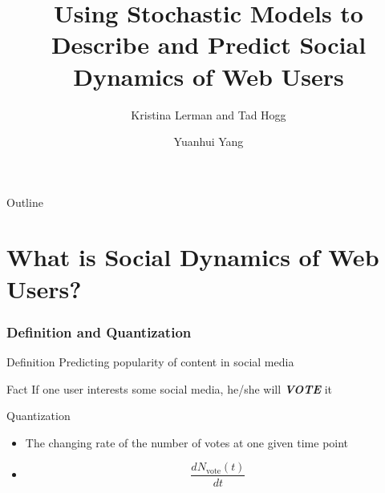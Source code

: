 \documentclass[aspectratio=43]{beamer}
\title{Using Stochastic Models to Describe and Predict Social Dynamics of Web Users}
\subtitle{Kristina Lerman and Tad Hogg}
\author{Yuanhui Yang}
\institute{Department of Electrical Engineering and Computer Science}
\date{}
\begin{document}
\maketitle

\begin{frame}{Outline}
  \tableofcontents[pausesections]
\end{frame}

\section[Definition]{What is Social Dynamics of Web Users?}
\begin{frame}
\frametitle{Definition and Quantization}
\centering
\begin{minipage}{\textwidth}
\begin{exampleblock}{Definition}
Predicting popularity of content in social media
\end{exampleblock}

\begin{block}{Fact}
If one user interests some social media, he/she will \textbf{\textsl{VOTE}} it
\end{block}

\begin{alertblock}{Quantization}
\begin{itemize}
\item The changing rate of the number of votes at one given time point
\item \begin{equation}
\dfrac{dN_{\mathrm{vote}}\left(t\right)}{dt}
\end{equation}
\end{itemize}
\end{alertblock}
\end{minipage}
\end{frame}
\end{document}
